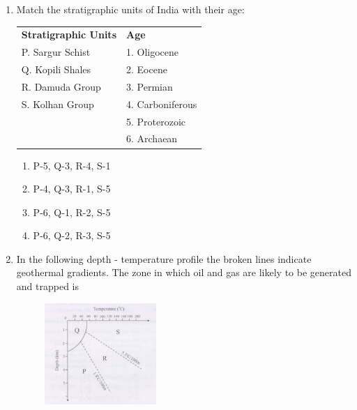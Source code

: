 \documentclass[journal,12pt,onecolumn]{IEEEtran}
\theoremstyle{remark}
\begin{document}
\begin{enumerate}
    \item Match the stratigraphic units of India with their age:

    \hfill{}
    
    \begin{tabular}{ll}
        \textbf{Stratigraphic Units} & \textbf{Age} \\
        P. Sargur Schist & 1. Oligocene \\
        Q. Kopili Shales & 2. Eocene \\
        R. Damuda Group & 3. Permian \\
        S. Kolhan Group & 4. Carboniferous \\
        & 5. Proterozoic \\
        & 6. Archaean \\
    \end{tabular}
    
    \begin{multicols}{2}
        \begin{enumerate}
            \item P-5, Q-3, R-4, S-1
            \item P-4, Q-3, R-1, S-5
            \item P-6, Q-1, R-2, S-5
            \item P-6, Q-2, R-3, S-5
        \end{enumerate}
    \end{multicols}

    \item In the following depth - temperature profile the broken lines indicate geothermal gradients. The zone in which oil and gas are likely to be generated and trapped is

    \hfill{}
    
    \begin{figure}[h!]
        \centering
        \includegraphics[width=0.4\textwidth]{figs/fig1.png}
        \caption{}
        \label{fig:q27}
    \end{figure}
    

\end{enumerate}
\end{document}
